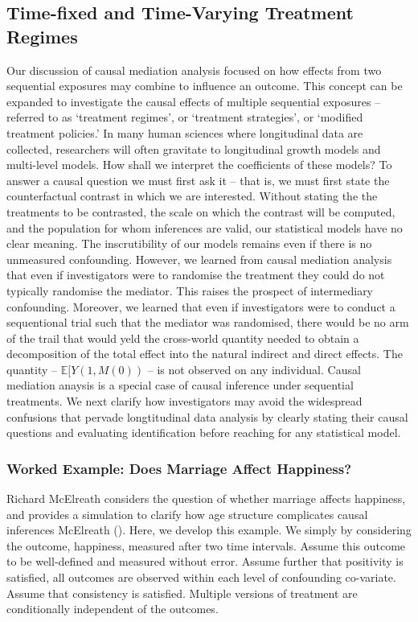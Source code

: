\documentclass[
  single column]{article}
\begin{document}
\subsection{Time-fixed and Time-Varying Treatment
Regimes}\label{time-fixed-and-time-varying-treatment-regimes}

Our discussion of causal mediation analysis focused on how effects from
two sequential exposures may combine to influence an outcome. This
concept can be expanded to investigate the causal effects of multiple
sequential exposures -- referred to as `treatment regimes', or
`treatment strategies', or `modified treatment policies.' In many human
sciences where longitudinal data are collected, researchers will often
gravitate to longitudinal growth models and multi-level models. How
shall we interpret the coefficients of these models? To answer a causal
question we must first ask it -- that is, we must first state the
counterfactual contrast in which we are interested. Without stating the
the treatments to be contrasted, the scale on which the contrast will be
computed, and the population for whom inferences are valid, our
statistical models have no clear meaning. The inscrutibility of our
models remains even if there is no unmeasured confounding. However, we
learned from causal mediation analysis that even if investigators were
to randomise the treatment they could do not typically randomise the
mediator. This raises the prospect of intermediary confounding.
Moreover, we learned that even if investigators were to conduct a
sequentional trial such that the mediator was randomised, there would be
no arm of the trail that would yeld the cross-world quantity needed to
obtain a decomposition of the total effect into the natural indirect and
direct effects. The quantity -- \(\mathbb{E}[Y(1, M(0))\) -- is not
observed on any individual. Causal mediation anaysis is a special case
of causal inference under sequential treatments. We next clarify how
investigators may avoid the widespread confusions that pervade
longtitudinal data analysis by clearly stating their causal questions
and evaluating identification before reaching for any statistical model.

\subsubsection{Worked Example: Does Marriage Affect
Happiness?}\label{worked-example-does-marriage-affect-happiness}

Richard McElreath considers the question of whether marriage affects
happiness, and provides a simulation to clarify how age structure
complicates causal inferences McElreath
(). Here, we develop this example. We
simply by considering the outcome, happiness, measured after two time
intervals. Assume this outcome to be well-defined and measured without
error. Assume further that positivity is satisfied, all outcomes are
observed within each level of confounding co-variate. Assume that
consistency is satisfied. Multiple versions of treatment are
conditionally independent of the outcomes.
\end{document}
